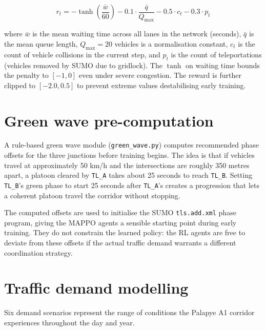 \documentclass[11pt, a4paper]{report}
\begin{document}
\begin{equation}
r_t = -\tanh\!\left(\frac{\bar{w}}{60}\right) - 0.1 \cdot \frac{\bar{q}}{Q_{\max}} - 0.5 \cdot c_t - 0.3 \cdot p_t
\label{eq:reward}
\end{equation}

where $\bar{w}$ is the mean waiting time across all lanes in the network (seconds), $\bar{q}$ is the mean queue length, $Q_{\max} = 20$ vehicles is a normalisation constant, $c_t$ is the count of vehicle collisions in the current step, and $p_t$ is the count of teleportations (vehicles removed by SUMO due to gridlock). The $\tanh$ on waiting time bounds the penalty to $[-1, 0]$ even under severe congestion. The reward is further clipped to $[-2.0, 0.5]$ to prevent extreme values destabilising early training.

\section{Green wave pre-computation}

A rule-based green wave module (\texttt{green\_wave.py}) computes recommended phase offsets for the three junctions before training begins. The idea is that if vehicles travel at approximately 50 km/h and the intersections are roughly 350 metres apart, a platoon cleared by \texttt{TL\_A} takes about 25 seconds to reach \texttt{TL\_B}. Setting \texttt{TL\_B}'s green phase to start 25 seconds after \texttt{TL\_A}'s creates a progression that lets a coherent platoon travel the corridor without stopping.

The computed offsets are used to initialise the SUMO \texttt{tls.add.xml} phase program, giving the MAPPO agents a sensible starting point during early training. They do not constrain the learned policy: the RL agents are free to deviate from these offsets if the actual traffic demand warrants a different coordination strategy.

\section{Traffic demand modelling}

Six demand scenarios represent the range of conditions the Palapye A1 corridor experiences throughout the day and year.
\end{document}
